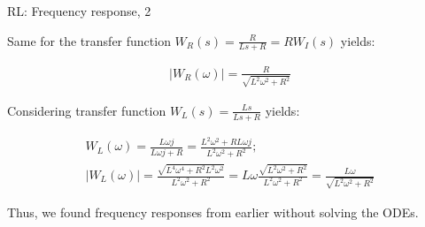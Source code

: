 \documentclass{beamer}
\begin{document}
\begin{frame}{RL: Frequency response, 2}
	\begin{flushleft}
		
		Same for the transfer function $W_R(s) = \frac{R}{Ls + R} = R W_I(s) $ yields:
		
		\begin{align}
			|W_R(\omega)| = 
			\frac{R}{\sqrt{L^2\omega^2 + R^2}}
		\end{align}
	
		Considering transfer function $W_L(s) = \frac{Ls}{Ls + R}$ yields:
		
		\begin{align*}
			W_L(\omega) = \frac{L\omega j}{L\omega j + R} =
			\frac{L^2\omega^2 + RL\omega j}{L^2\omega^2 + R^2}; \\
			|W_L(\omega)| = \frac{\sqrt{L^4\omega^4 + R^2L^2\omega^2}}{L^2\omega^2 + R^2} =
			L\omega\frac{\sqrt{L^2\omega^2 + R^2}}{L^2\omega^2 + R^2} =
			\frac{L\omega}{\sqrt{L^2\omega^2 + R^2}}
		\end{align*}
	
		Thus, we found frequency responses from earlier without solving the ODEs.
		
	\end{flushleft}
\end{frame}
\end{document}
